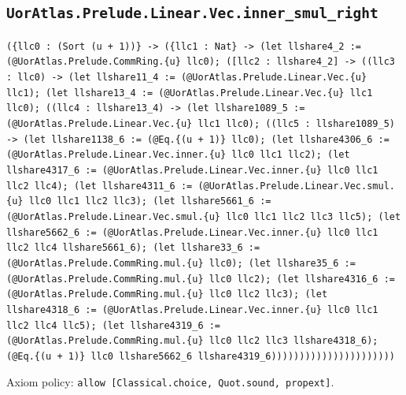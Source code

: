 \documentclass[11pt]{article}
\begin{document}
\subsection*{\texttt{UorAtlas.Prelude.Linear.Vec.inner\_smul\_right}}
\noindent\texttt{(\{llc0 : (Sort (u + 1))\} -> (\{llc1 : Nat\} -> (let llshare4\_2 := (@UorAtlas.Prelude.CommRing.\{u\} llc0); ([llc2 : llshare4\_2] -> ((llc3 : llc0) -> (let llshare11\_4 := (@UorAtlas.Prelude.Linear.Vec.\{u\} llc1); (let llshare13\_4 := (@UorAtlas.Prelude.Linear.Vec.\{u\} llc1 llc0); ((llc4 : llshare13\_4) -> (let llshare1089\_5 := (@UorAtlas.Prelude.Linear.Vec.\{u\} llc1 llc0); ((llc5 : llshare1089\_5) -> (let llshare1138\_6 := (@Eq.\{(u + 1)\} llc0); (let llshare4306\_6 := (@UorAtlas.Prelude.Linear.Vec.inner.\{u\} llc0 llc1 llc2); (let llshare4317\_6 := (@UorAtlas.Prelude.Linear.Vec.inner.\{u\} llc0 llc1 llc2 llc4); (let llshare4311\_6 := (@UorAtlas.Prelude.Linear.Vec.smul.\{u\} llc0 llc1 llc2 llc3); (let llshare5661\_6 := (@UorAtlas.Prelude.Linear.Vec.smul.\{u\} llc0 llc1 llc2 llc3 llc5); (let llshare5662\_6 := (@UorAtlas.Prelude.Linear.Vec.inner.\{u\} llc0 llc1 llc2 llc4 llshare5661\_6); (let llshare33\_6 := (@UorAtlas.Prelude.CommRing.mul.\{u\} llc0); (let llshare35\_6 := (@UorAtlas.Prelude.CommRing.mul.\{u\} llc0 llc2); (let llshare4316\_6 := (@UorAtlas.Prelude.CommRing.mul.\{u\} llc0 llc2 llc3); (let llshare4318\_6 := (@UorAtlas.Prelude.Linear.Vec.inner.\{u\} llc0 llc1 llc2 llc4 llc5); (let llshare4319\_6 := (@UorAtlas.Prelude.CommRing.mul.\{u\} llc0 llc2 llc3 llshare4318\_6); (@Eq.\{(u + 1)\} llc0 llshare5662\_6 llshare4319\_6))))))))))))))))))))))}\par
\noindent Axiom policy: \texttt{allow [Classical.choice, Quot.sound, propext]}.\par
\end{document}
